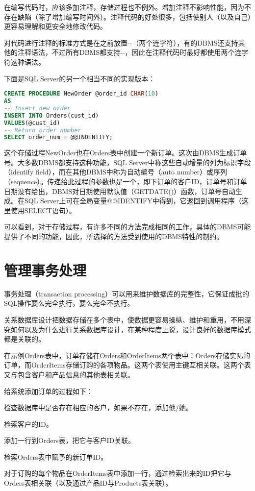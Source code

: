 在编写代码时，应该多加注释，存储过程也不例外。增加注释不影响性能，因为不存在缺陷（除了增加编写时间外）。注释代码的好处很多，包括使别人（以及自己）更容易理解和更安全地修改代码。

对代码进行注释的标准方式是在之前放置-\/-（两个连字符），有的DBMS还支持其他的注释语法，不过所有DBMS都支持-\/-，因此在注释代码时最好都使用两个连字符这种语法。

下面是SQL Server的另一个相当不同的实现版本：

\begin{lstlisting}[language=SQL]
CREATE PROCEDURE NewOrder @order_id CHAR(10)
AS
-- Insert new order
INSERT INTO Orders(cust_id)
VALUES(@cust_id)
-- Return order number
SELECT order_num = @@INDENTIFY;
\end{lstlisting}

这个存储过程NewOrder也在Orders表中创建一个新订单。这次由DBMS生成订单号。大多数DBMS都支持这种功能，SQL Server中称这些自动增量的列为标识字段（identify field），而在其他DBMS中称为自动编号（auto number）或序列（sequence）。传递给此过程的参数也是一个，即下订单的客户ID，订单号和订单日期没有给出，DBMS对日期使用默认值（GETDATE()）函数，订单号自动生成。在SQL Server上可在全局变量@@IDENTIFY中得到，它返回到调用程序（这里使用SELECT语句）。


可以看到，对于存储过程，有许多不同的方法完成相同的工作，具体的DBMS可能提供了不同的功能，因此，所选择的方法受到使用的DBMS特性的制约。



\section{管理事务处理}

事务处理（transaction processing）可以用来维护数据库的完整性，它保证成批的SQL操作要么完全执行，要么完全不执行。

关系数据库设计把数据存储在多个表中，使数据更容易操纵、维护和重用，不用深究如何以及为什么进行关系数据库设计，在某种程度上说，设计良好的数据库模式都是关联的。

在示例Orders表中，订单存储在Orders和OrderItems两个表中：Orders存储实际的订单，而OrderItems存储订购的各项物品。这两个表使用主键互相关联。这两个表又与包含客户和产品信息的其他表相关联。

给系统添加订单的过程如下：

\begin{compactenum}
\item 检查数据库中是否存在相应的客户，如果不存在，添加他/她。
\item 检索客户的ID。
\item 添加一行到Orders表，把它与客户ID关联。
\item 检索Orders表中赋予的新订单ID。
\item 对于订购的每个物品在OrderItems表中添加一行，通过检索出来的ID把它与Orders表相关联（以及通过产品ID与Products表关联）。
\end{compactenum}

